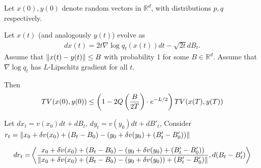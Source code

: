 \begin{lemma}
\label{l:sde(1)_tv_convergence}
Let $x(0),y(0)$ denote random vectors in $\mathbb{R}^d$, with distributions $p,q$ respectively. 

Let $x(t)$ (and analogously $y(t)$) evolve as
\begin{align*}
    d x(t) = 2t \nabla \log q_t(x(t)) dt - \sqrt{2t} dB_t.
\end{align*}
Assume that $\left\| x(t) - y(t) \right\| \leq B$ with probability 1 for some $B\in\mathbb{R}^d$. Assume that $\nabla \log q_t$ has $L$-Lipschitz gradient for all $t$. 

Then
\begin{align*}
    TV(x(0),y(0)) \leq \left( 1- 2Q\left( \frac{B}{2T} \right) \cdot e^{-L/2} \right) TV(x(T),y(T))
\end{align*}
\end{lemma}


Let $d x_t = v(x_0) dt + dB_t$, $d y_t = v(y_0) dt + dB'_t$, Consider \\$r_t = \left\| x_0 + \delta v(x_0) + (B_t - B_0) - \left( y_0 + \delta v(y_0) + (B'_t - B'_0)  \right) \right\|$

\begin{align*}
    d r_t
    =& \left\langle \frac{x_0 + \delta v(x_0) + (B_t - B_0) - \left( y_0 + \delta v(y_0) + (B'_t - B'_0)  \right)}{\left\| x_0 + \delta v(x_0) + (B_t - B_0) - \left( y_0 + \delta v(y_0) \right) + (B'_t - B'_0) \right\|}, d (B_t - B'_t) \right\rangle\\
\end{align*}



